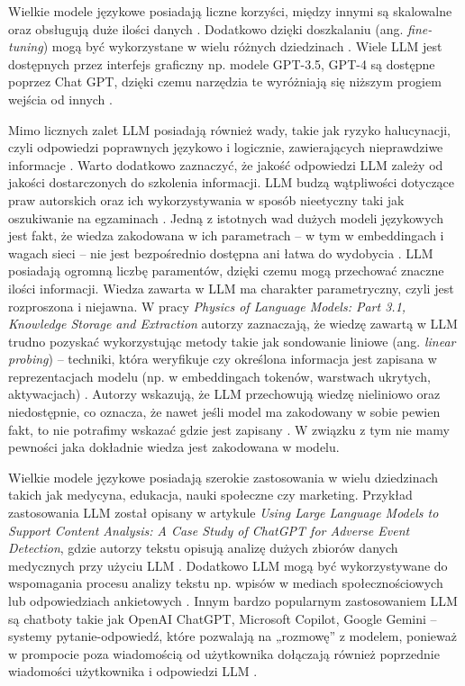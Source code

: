 \documentclass[
a4paper,
12pt,
]{article}
\begin{document}
Wielkie modele językowe posiadają liczne korzyści, między innymi są skalowalne oraz obsługują duże ilości danych \cite{zalety1}. Dodatkowo dzięki doszkalaniu (ang. \textit{fine-tuning}) mogą być wykorzystane w wielu różnych dziedzinach \cite{zalety1}. Wiele LLM jest dostępnych przez interfejs graficzny np. modele GPT-3.5, GPT-4 są dostępne poprzez Chat GPT, dzięki czemu narzędzia te wyróżniają się niższym progiem wejścia od innych \cite{zalety2}. 

Mimo licznych zalet LLM posiadają również wady, takie jak ryzyko halucynacji, czyli odpowiedzi poprawnych językowo i logicznie, zawierających nieprawdziwe informacje \cite{zalety2}. Warto dodatkowo zaznaczyć, że jakość odpowiedzi LLM zależy od jakości dostarczonych do szkolenia informacji. LLM budzą wątpliwości dotyczące praw autorskich oraz ich wykorzystywania w sposób nieetyczny taki jak oszukiwanie na egzaminach \cite{prawo}. Jedną z istotnych wad dużych modeli językowych jest fakt, że wiedza zakodowana w ich parametrach -- w tym w embeddingach i wagach sieci -- nie jest bezpośrednio dostępna ani łatwa do wydobycia \cite{llm:knowledge}. LLM posiadają ogromną liczbę paramentów, dzięki czemu mogą przechować znaczne ilości informacji. Wiedza zawarta w LLM ma charakter parametryczny, czyli jest rozproszona i niejawna. W pracy \textit{Physics of Language Models: Part 3.1, Knowledge Storage and Extraction} autorzy zaznaczają, że wiedzę zawartą w LLM trudno pozyskać wykorzystując metody takie jak sondowanie liniowe (ang. \textit{linear probing}) -- techniki, która weryfikuje czy określona informacja jest zapisana w reprezentacjach modelu (np. w embeddingach tokenów, warstwach ukrytych, aktywacjach) \cite{llm:knowledge}. Autorzy wskazują, że LLM przechowują wiedzę nieliniowo oraz niedostępnie, co oznacza, że nawet jeśli model ma zakodowany w sobie pewien fakt, to nie potrafimy wskazać gdzie jest zapisany \cite{llm:knowledge}. W związku z tym nie mamy pewności jaka dokładnie wiedza jest zakodowana w modelu.

Wielkie modele językowe posiadają szerokie zastosowania w wielu dziedzinach takich jak medycyna, edukacja, nauki społeczne czy marketing. Przykład zastosowania LLM został opisany w artykule \textit{Using Large Language Models to Support Content Analysis: A Case Study of ChatGPT for Adverse Event Detection}, gdzie autorzy tekstu opisują analizę dużych zbiorów danych medycznych przy użyciu LLM \cite{info:doi/10.2196/52499}. 
Dodatkowo LLM mogą być wykorzystywane do wspomagania procesu analizy tekstu np. wpisów w mediach społecznościowych lub odpowiedziach ankietowych \cite{info:doi/s00146-025-02487-4}.
Innym bardzo popularnym zastosowaniem LLM są chatboty takie jak OpenAI ChatGPT, Microsoft Copilot, Google Gemini -- systemy pytanie-odpowiedź, które pozwalają na „rozmowę” z modelem, ponieważ w prompocie poza wiadomością od użytkownika dołączają również poprzednie wiadomości użytkownika i odpowiedzi LLM \cite{llm:chatgptcopilotgemini}.
\end{document}
